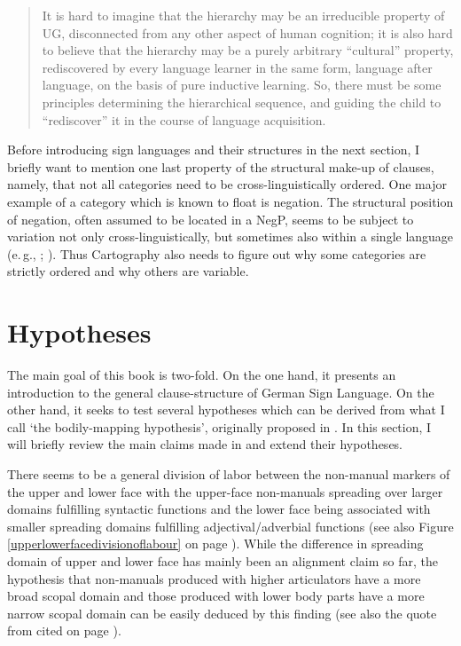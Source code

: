 \begin{quote}
It is hard to imagine that the hierarchy may be an irreducible property of UG, disconnected from any other aspect of human cognition; it is also hard to believe that the hierarchy may be a purely arbitrary ``cultural'' property, rediscovered by every language learner in the same form, language after language, on the basis of pure inductive learning. So, there must be some principles determining the hierarchical sequence, and guiding the child to ``rediscover'' it in the course of language acquisition. \citep[52]{cinque2008cartography}
\end{quote}

\noindent Before introducing sign languages and their structures in the next section, I briefly want to mention one last property of the structural make-up of clauses, namely, that not all categories need to be cross-linguistically ordered. One major example of a category which is known to float is negation. The structural position of negation, often assumed to be located in a NegP, seems to be subject to variation not only cross-linguistically, but sometimes also within a single language (e.\,g., \citealt{ouhalla1990sentential, ouhalla1991functional}; \citealt{zanuttini1991syntactic}). Thus Cartography also needs to figure out why some categories are strictly ordered and why others are variable.




\section{Hypotheses}\label{hypotheses}
The main goal of this book is two-fold. On the one hand, it presents an introduction to the general clause-structure of German Sign Language. On the other hand, it seeks to test several hypotheses which can be derived from what I call `the bodily-mapping hypothesis', originally proposed in \citet{bross2017scope}. In this section, I will briefly review the main claims made in \citet{bross2017scope} and extend their hypotheses. %

There seems to be a general division of labor between the non-manual markers of the upper and lower face with the upper-face non-manuals spreading over larger domains fulfilling syntactic functions and the lower face being associated with smaller spreading domains fulfilling adjectival/adverbial functions (see also Figure \ref{upperlowerfacedivisionoflabour} on page \pageref{upperlowerfacedivisionoflabour}). While the difference in spreading domain of upper and lower face has mainly been an alignment claim so far, the hypothesis that non-manuals produced with higher articulators have a more broad scopal domain and those produced with lower body parts have a more narrow scopal domain can be easily deduced by this finding (see also the quote from \citealt[249]{wilbur2009productive} cited on page \pageref{wilburquote}). 

